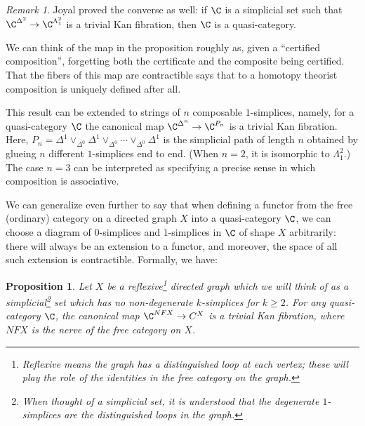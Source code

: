 \documentclass{conm-p-l}
\newtheorem{proposition}[theorem]{Proposition}
\theoremstyle{definition} \newtheorem{definition}[theorem]{Definition}
\theoremstyle{remark} \newtheorem{remark}[theorem]{Remark}
\numberwithin{equation}{section}
\begin{document}
\begin{remark}
  Joyal proved the converse as well: if $\C$ is a simplicial set
  such that $\C^{\Delta^2} \to \C^{\Lambda^2_1}$ is a trivial Kan
  fibration, then $\C$ is a quasi-category.
\end{remark}

We can think of the map in the proposition roughly as, given a
``certified composition'', forgetting both the certificate and the
composite being certified. That the fibers of this map are
contractible says that to a homotopy theorist composition is uniquely
defined after all.

This result can be extended to strings of $n$ composable
$1$-simplices, namely, for a quasi-category $\C$ the canonical map
$\C^{\Delta^n} \to \C^{P_n}$ is a trivial Kan fibration. Here, $P_n =
\Delta^1 \vee_{\Delta^0} \Delta^1 \vee_{\Delta^0} \cdots
\vee_{\Delta^0} \Delta^1$ is the simplicial path of length $n$
obtained by glueing $n$ different $1$-simplices end to end. (When
$n=2$, it is isomorphic to $\Lambda^2_1$.) The case $n=3$ can be
interpreted as specifying a precise sense in which composition is
associative.

We can generalize even further to say that when defining a functor
from the free (ordinary) category on a directed graph $X$ into a
quasi-category $\C$, we can choose a diagram of $0$-simplices and
$1$-simplices in $\C$ of shape $X$ arbitrarily: there will always be
an extension to a functor, and moreover, the space of all such
extension is contractible. Formally, we have:

\begin{proposition}\label{freecats}
Let $X$ be a reflexive\footnote{Reflexive means
the graph has a distinguished loop at each vertex; these will play the
role of the identities in the free category on the graph.} directed
graph which we will think of as a simplicial\footnote{When thought of
a simplicial set, it is understood that the degenerate $1$-simplices
are the distinguished loops in the graph.} set which has no
non-degenerate $k$-simplices for $k \ge 2$. For any quasi-category
$\C$, the canonical map $\C^{NFX} \to C^X$ is a trivial Kan fibration,
where $NFX$ is the nerve of the free category on $X$.
\end{proposition}
\end{document}
